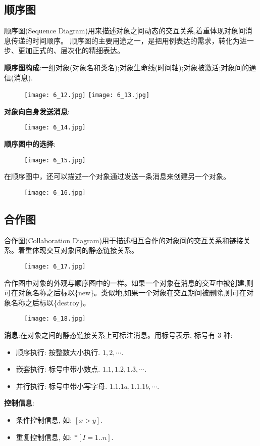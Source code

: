 \documentclass[../main.tex]{subfiles}
\begin{document}
\subsection{顺序图}
顺序图(Sequence Diagram)用来描述对象之间动态的交互关系,着重体现对象间消息传递的时间顺序。
顺序图的主要用途之一，是把用例表达的需求，转化为进一步、更加正式的、层次化的精细表达。

\textbf{顺序图构成}:一组对象(对象名和类名);对象生命线(时间轴);对象被激活;对象间的通信(消息).
\begin{figure}[H]
    \texttt{[image: 6\_12.jpg]}
    \texttt{[image: 6\_13.jpg]}
\end{figure}
\textbf{对象向自身发送消息}:
\begin{figure}[H]
    \texttt{[image: 6\_14.jpg]}
\end{figure}
\textbf{顺序图中的选择}:
\begin{figure}[H]
  \begin{center}
    \texttt{[image: 6\_15.jpg]}
  \end{center}
\end{figure}
在顺序图中，还可以描述一个对象通过发送一条消息来创建另一个对象。
\begin{figure}[H]
  \begin{center}
    \texttt{[image: 6\_16.jpg]}
  \end{center}
\end{figure}
\subsection{合作图}
合作图(Collaboration Diagram)用于描述相互合作的对象间的交互关系和链接关系。着重体现交互对象间的静态链接关系。
\begin{figure}[H]
  \begin{center}
    \texttt{[image: 6\_17.jpg]}
  \end{center}
\end{figure}
合作图中对象的外观与顺序图中的一样。如果一个对象在消息的交互中被创建,则可在对象名称之后标以\{new\}。类似地,如果一个对象在交互期间被删除,则可在对象名称之后标以\{destroy\}。
\begin{figure}[H]
  \begin{center}
    \texttt{[image: 6\_18.jpg]}
  \end{center}
\end{figure}
\textbf{消息}:在对象之间的静态链接关系上可标注消息。用标号表示, 标号有 3 种:
\begin{itemize}
  \item 顺序执行: 按整数大小执行. $ 1, 2, \cdots $.
  \item 嵌套执行: 标号中带小数点. $ 1.1, 1.2, 1.3, \cdots $.
  \item 并行执行: 标号中带小写字母. $ 1.1.1a, 1.1.1b, \cdots $.
\end{itemize}
\textbf{控制信息}:
\begin{itemize}
  \item 条件控制信息, 如: $ [x > y] $.
  \item 重复控制信息, 如: $ * [I=1..n] $.
\end{itemize}
\end{document}
